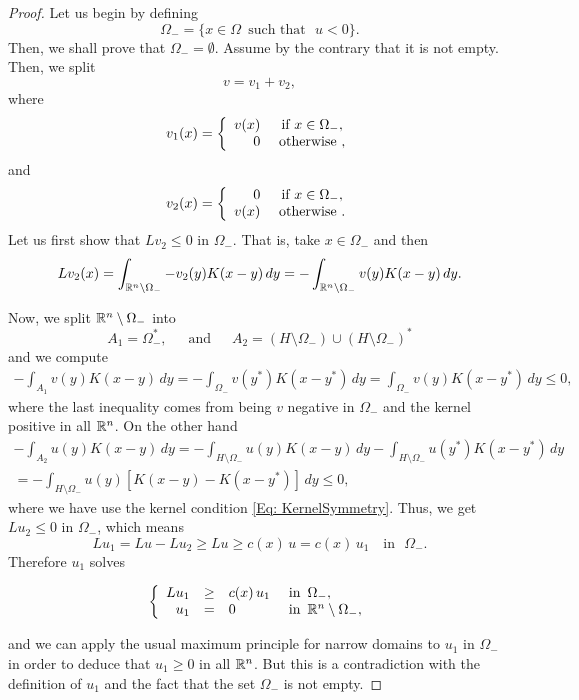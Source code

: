 \begin{proof}
Let us begin by defining
$$ \Omega_- = \{x\in \Omega \,\text{ such that }\,\, u<0\}. $$
Then, we shall prove that $\Omega_-=\emptyset$. Assume by the contrary that it is not empty. Then, we split 
$$ v = v_1+v_2, $$
where
\begin{equation*}
v_1(x) = 
\left\{\begin{array}{rcll}
v(x)  &\textrm{ if } x\in\Omega_-,\\
0 &\textrm{ otherwise },
\end{array} \right.
\end{equation*}
and
\begin{equation*}
v_2(x) = 
\left\{\begin{array}{rcll}
0  &\textrm{ if } x\in\Omega_-,\\
v(x) &\textrm{ otherwise }.
\end{array} \right.
\end{equation*}
Let us first show that $Lv_2\leq 0$ in $\Omega_-$. That is, take $x\in\Omega_-$ and then
$$ Lv_2(x) = \int_{\mathbb{R}^n\setminus\Omega_-} -v_2(y)K(x-y) \,dy = -\int_{\mathbb{R}^n\setminus\Omega_-} v(y)K(x-y) \,dy.  $$

Now, we split $\mathbb{R}^n\setminus\Omega_-$ into
$$ A_1 = \Omega_-^*,\,\,\,\,\,\,\,\text{ and }\,\,\,\,\,\,\, A_2 = \left(H\setminus\Omega_-\right)\cup\left(H\setminus\Omega_-\right)^* $$
and we compute
\begin{align*}
-\int_{A_1} v(y)K(x-y) \,dy = -\int_{\Omega_-} v(y^*)K(x-y^*) \,dy  = \int_{\Omega_-} v(y)K(x-y^*) \,dy \leq 0,
\end{align*}
where the last inequality comes from being $v$ negative in $\Omega_-$ and the kernel positive in all $\mathbb{R}^n$.
On the other hand
\begin{align*}
-\int_{A_2} u(y)K(x-y) \,dy = -\int_{H\setminus\Omega_-} u(y)K(x-y) \,dy  -\int_{H\setminus\Omega_-} u(y^*)K(x-y^*) \,dy \\ 
= -\int_{H\setminus\Omega_-} u(y)\left[K(x-y)-K(x-y^*)\right] \,dy \leq 0,
\end{align*}
where we have use the kernel condition \eqref{Eq: KernelSymmetry}. Thus, we get $Lu_2 \leq 0$ in $\Omega_-$, which means
$$ Lu_1 = Lu-Lu_2 \geq Lu \geq c(x)\,u = c(x)\,u_1 \,\,\,\,\text{ in }\,\,\Omega_-. $$
Therefore $u_1$ solves

\begin{equation*}
\left\{\begin{array}{rcll}
Lu_1 &\geq& c(x)\,u_1   &\textrm{ in } \,\Omega_-,\\
u_1 &=& 0 &\textrm{ in }\,\mathbb{R}^n\setminus\Omega_-,
\end{array} \right.
\end{equation*}

and we can apply the usual maximum principle for narrow domains to $u_1$ in $\Omega_-$ in order to deduce that $u_1\geq 0$ in all $\mathbb{R}^n$. But this is a contradiction with the definition of $u_1$ and the fact that the set $\Omega_-$ is not empty.
\end{proof}


